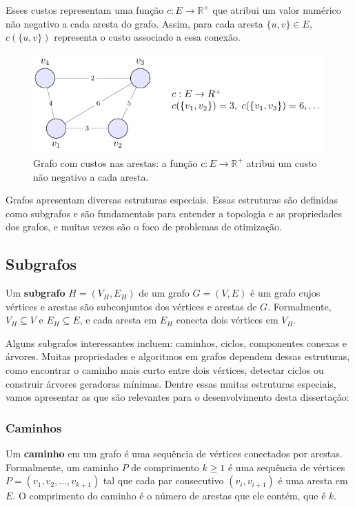 Esses custos representam uma função \(c: E \to \mathbb{R}^+\) que atribui um valor numérico não negativo a cada aresta do grafo. Assim, para cada aresta \(\{u, v\} \in E\), \(c(\{u, v\})\) representa o custo associado a essa conexão.


\begin{figure}[H]
	\centering
	\includegraphics[width=0.9\linewidth]{figures/fig_grafo_custos.pdf}

	\caption{Grafo com custos nas arestas: a função $c:E\to\mathbb{R}^+$ atribui um custo não negativo a cada aresta.}
	\label{fig:grafo-custos}
\end{figure}



Grafos apresentam diversas estruturas especiais. Essas estruturas são definidas como subgrafos e são fundamentais para entender a topologia e as propriedades dos grafos, e muitas vezes são o foco de problemas de otimização.

\subsection{Subgrafos}
Um \textbf{subgrafo} \(H = (V_H, E_H)\) de um grafo \(G = (V, E)\) é um grafo cujos vértices e arestas são subconjuntos dos vértices e arestas de \(G\). Formalmente, \(V_H \subseteq V\) e \(E_H \subseteq E\), e cada aresta em \(E_H\) conecta dois vértices em \(V_H\).


Alguns subgrafos interessantes incluem: caminhos, ciclos, componentes conexas e árvores. Muitas propriedades e algoritmos em grafos dependem dessas estruturas, como encontrar o caminho mais curto entre dois vértices, detectar ciclos ou construir árvores geradoras mínimas. Dentre essas muitas estruturas especiais, vamos apresentar as que são relevantes para o desenvolvimento desta dissertação:

\subsubsection{Caminhos}
Um \textbf{caminho} em um grafo é uma sequência de vértices conectados por arestas. Formalmente, um caminho \(P\) de comprimento \(k\geq 1\) é uma sequência de vértices \(P = (v_1, v_2, \ldots, v_{k+1})\) tal que cada par consecutivo \((v_i, v_{i+1})\) é uma aresta em \(E\). O comprimento do caminho é o número de arestas que ele contém, que é \(k\).


